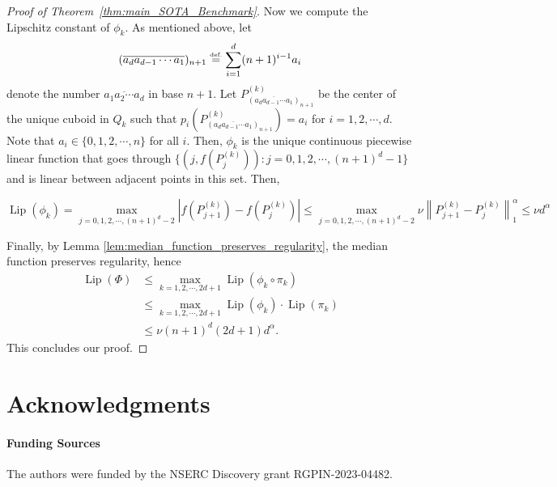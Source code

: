 \documentclass{article}
\numberwithin{equation}{section}
\theoremstyle{definition}
\newcommand{\eqdef}{\ensuremath{\stackrel{\mbox{\upshape\tiny def.}}{=}}}
\begin{document}
\begin{proof}[{Proof of Theorem~\ref{thm:main_SOTA_Benchmark}}]
Now we compute the Lipschitz constant of $\phi_k$. As mentioned above, let
$$(\overline{a_da_{d-1}\cdots a_1})_{n+1} \eqdef \sum_{i=1}^d (n+1)^{i-1}a_i$$ 
denote the number $\overline{a_1a_2\cdots a_d}$ in base $n+1$. Let $P_{(\overline{a_da_{d-1}\cdots a_1})_{n+1}}^{(k)}$ be the center of the unique cuboid in $Q_k$ such that $p_i\left(P_{(\overline{a_da_{d-1}\cdots a_1})_{n+1}}^{(k)}\right)=a_i$ for $i=1,2,\cdots,d$. Note that $a_i\in\{0,1,2,\cdots,n\}$ for all $i$. Then, $\phi_k$ is the unique continuous piecewise linear function that goes through 
$\{(j, f(P_j^{(k)}) ): j=0,1,2,\cdots,(n+1)^d-1 \}$ and is linear between adjacent points in this set. Then, 

$$\operatorname{Lip}(\phi_k)
= \max\limits_{j=0,1,2,\cdots,(n+1)^d-2}{\left|f(P_{j+1}^{(k)})-f(P_j^{(k)})\right|} 
\le
\max\limits_{j=0,1,2,\cdots,(n+1)^d-2}
{\nu \left\|P_{j+1}^{(k)}-P_j^{(k)}\right\|_1^{\alpha}} 
\le
\nu d^{\alpha}
$$


Finally, by Lemma \ref{lem:median_function_preserves_regularity}, the median function preserves regularity, hence
\begin{align*}
    \operatorname{Lip}(\Phi) 
    &\le \max\limits_{k=1,2,\cdots,2d+1}{\operatorname{Lip}(\phi_k\circ\pi_k)} \\
    &\le \max\limits_{k=1,2,\cdots,2d+1}{\operatorname{Lip}(\phi_k)} \cdot {\operatorname{Lip}(\pi_k)} \\
    &\le \nu (n+1)^d (2d+1) d^{\alpha}.
\end{align*}
This concludes our proof.
\end{proof}




\section{Acknowledgments}
\label{s:Acknowledgments}
\paragraph{Funding Sources} The authors were funded by the NSERC Discovery grant RGPIN-2023-04482.



\end{document}
